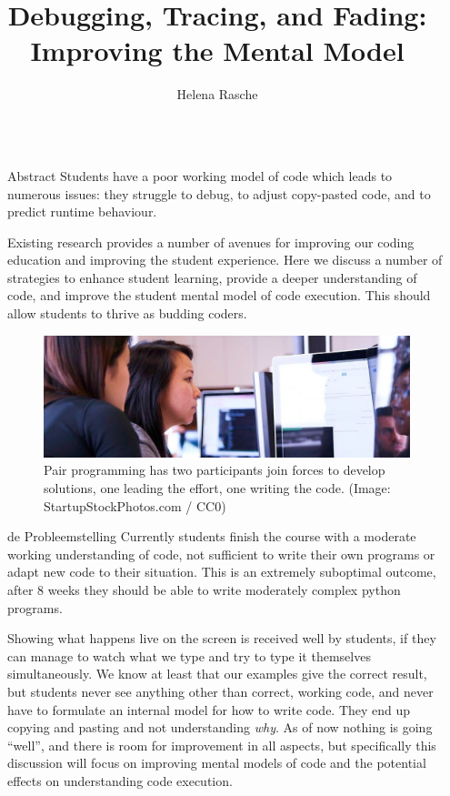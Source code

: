 \documentclass[final]{beamer}
\title{Debugging, Tracing, and Fading: Improving the Mental Model}
\author{Helena Rasche}
\institute[ATGM]{Avans ATGM}
\newlength{\sepwidth}
\newlength{\colwidth}
\newcommand{\separatorcolumn}{\begin{column}{\sepwidth}\end{column}}
\begin{document}
\begin{frame}[t,fragile]
\begin{columns}[t]
\separatorcolumn

\begin{column}{\colwidth}

  \begin{block}{Abstract}
    \large Students have a poor working model of code which leads to numerous issues:
    they struggle to debug, to adjust copy-pasted code, and to predict runtime
    behaviour.

    Existing research provides a number of avenues for improving our coding education and improving the student experience. Here we discuss a number of strategies to enhance student learning, provide a deeper understanding of code, and improve the student mental model of code execution. This should allow students to thrive as budding coders.

    \begin{figure}[ht]
        \centering
        \includegraphics[width=\textwidth]{pair-programming.jpg}
        \caption{Pair programming has two participants join forces to develop solutions, one leading the effort, one writing the code. (Image: StartupStockPhotos.com / CC0)}
        \label{fig:pair}
    \end{figure}
  \end{block}

  \begin{block}{de Probleemstelling}
    Currently students finish the course with a moderate working understanding of
    code, not sufficient to write their own programs or adapt new code to their
    situation. This is an extremely suboptimal outcome, after 8 weeks they
    should be able to write moderately complex python programs.

    Showing what happens live on the screen is received well by students, if
    they can manage to watch what we type and try to type it themselves
    simultaneously. We know at least that our examples give the correct result,
    but students never see anything other than correct, working code, and never
    have to formulate an internal model for how to write code. They end up
    copying and pasting and not understanding \emph{why}. As of now nothing is going
    ``well'', and there is room for improvement in all aspects, but specifically
    this discussion will focus on improving mental models of code and the
    potential effects on understanding code execution.


\end{block}
\end{column}
\end{columns}
\end{frame}
\end{document}
